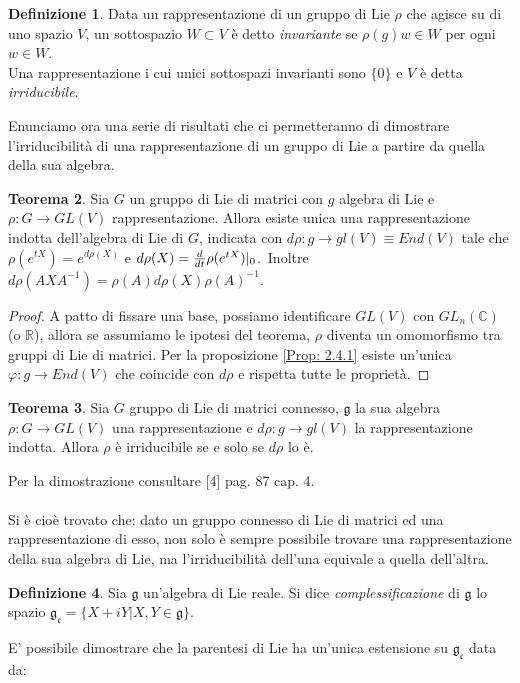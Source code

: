 \documentclass[12pt,a4paper]{report}
\theoremstyle{definition}
\newtheorem{Def}{Definizione}[chapter]
\theoremstyle{Theorem}
\newtheorem{Theo}[Def]{Teorema}
\theoremstyle{definition}
\theoremstyle{definition}
\theoremstyle{definition}
\begin{document}
\begin{Def}
	Data un rappresentazione di un gruppo di Lie $\rho$ che agisce su di uno spazio $V$, un sottospazio $W\subset V$ è detto \textit{invariante} se $\rho(g)w\in W$ per ogni $w\in W$.\\
	Una rappresentazione i cui unici sottospazi invarianti sono $\{0\}$ e $V$ è detta \textit{irriducibile}.
\end{Def}
Enunciamo ora una serie di risultati che ci permetteranno di dimostrare l'irriducibilità di una rappresentazione di un gruppo di Lie a partire da quella della sua algebra.
\begin{Theo}
	Sia $G$ un gruppo di Lie di matrici con $g$ algebra di Lie e $\rho:G\rightarrow GL(V)$ rappresentazione. Allora esiste unica una rappresentazione indotta dell'algebra di Lie di $G$, indicata con $d\rho:g\rightarrow gl(V)\equiv End(V)$ tale che $\rho(e^{tX})=e^{d\rho(X)}$ e $d\rho(X)={d\over dt}\rho(e^{tX})|_0$.\
	Inoltre $d\rho(AXA^{-1})=\rho(A)d\rho(X)\rho(A)^{-1}$.	
\end{Theo}
\begin{proof}
	A patto di fissare una base, possiamo identificare $GL(V)$ con $GL_n(\mathbb{C})$ (o $\mathbb{R}$), allora se assumiamo le ipotesi del teorema, $\rho$ diventa un omomorfismo tra gruppi di Lie di matrici. Per la proposizione \ref{Prop: 2.4.1} esiste un'unica $\varphi:g\rightarrow End(V)$ che coincide con $d\rho$ e rispetta tutte le proprietà.
\end{proof}
\begin{Theo}\label{Theo: 3.1}
	Sia $G$ gruppo di Lie di matrici connesso, $\mathfrak{g}$ la sua algebra $\rho:G\rightarrow GL(V)$ una rappresentazione e $d\rho:g\rightarrow gl(V)$ la rappresentazione indotta. Allora $\rho$ è irriducibile se e solo se $d\rho$ lo è.
\end{Theo}
Per la dimostrazione consultare [4] pag. 87 cap. 4.\\
\\
Si è cioè trovato che: dato un gruppo connesso di Lie di matrici ed una rappresentazione di esso, non solo è sempre possibile trovare una rappresentazione della sua algebra di Lie, ma l'irriducibilità dell'una equivale a quella dell'altra.
\begin{Def}
	Sia $\mathfrak{g}$ un'algebra di Lie reale. Si dice \textit{complessificazione} di $\mathfrak{g}$ lo spazio $\mathfrak{g_c}=\{X+iY|X,Y\in\mathfrak{g}\}$.
\end{Def}
E' possibile dimostrare che la parentesi di Lie ha un'unica estensione su $\mathfrak{g_c}$ data da:
\end{document}
